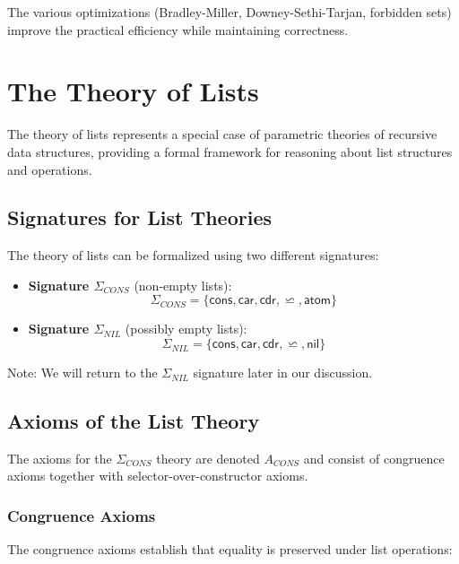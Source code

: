 \documentclass[11pt,a4paper]{article}
\theoremstyle{definition}
\theoremstyle{plain}
\theoremstyle{remark}
\begin{document}
The various optimizations (Bradley-Miller, Downey-Sethi-Tarjan, forbidden sets) improve the practical efficiency while maintaining correctness.


\section{The Theory of Lists}

The theory of lists represents a special case of parametric theories of recursive data structures, providing a formal framework for reasoning about list structures and operations.

\subsection{Signatures for List Theories}

\begin{tcolorbox}[colback=blue!5!white,colframe=blue!75!black,title=\textbf{List Theory Signatures}]
The theory of lists can be formalized using two different signatures:

\begin{itemize}
    \item \textbf{Signature $\Sigma_{CONS}$} (non-empty lists):
    \[
    \Sigma_{CONS} = \{\textsf{cons}, \textsf{car}, \textsf{cdr}, \backsimeq, \textsf{atom}\}
    \]

    \item \textbf{Signature $\Sigma_{NIL}$} (possibly empty lists):
    \[
    \Sigma_{NIL} = \{\textsf{cons}, \textsf{car}, \textsf{cdr}, \backsimeq, \textsf{nil}\}
    \]
\end{itemize}

Note: We will return to the $\Sigma_{NIL}$ signature later in our discussion.
\end{tcolorbox}

\subsection{Axioms of the List Theory}

The axioms for the $\Sigma_{CONS}$ theory are denoted $A_{CONS}$ and consist of congruence axioms together with selector-over-constructor axioms.

\subsubsection{Congruence Axioms}

The congruence axioms establish that equality is preserved under list operations:
\end{document}
